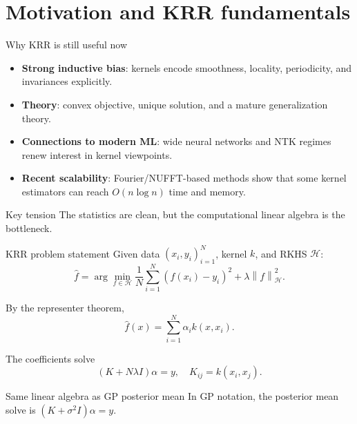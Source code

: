 \documentclass[aspectratio=169,10pt]{beamer}
\newcommand{\norm}[1]{\left\lVert #1 \right\rVert}
\begin{document}
\section{Motivation and KRR fundamentals}

\begin{frame}{Why KRR is still useful now}
\begin{itemize}
  \item \textbf{Strong inductive bias}: kernels encode smoothness, locality, periodicity, and invariances explicitly.
  \item \textbf{Theory}: convex objective, unique solution, and a mature generalization theory.
  \item \textbf{Connections to modern ML}: wide neural networks and NTK regimes renew interest in kernel viewpoints.
  \item \textbf{Recent scalability}: Fourier/NUFFT-based methods show that some kernel estimators can reach $O(n\log n)$ time and memory.
\end{itemize}

\vspace{0.5em}
\begin{block}{Key tension}
The statistics are clean, but the computational linear algebra is the bottleneck.
\end{block}
\end{frame}

\begin{frame}{KRR problem statement}
Given data $(x_i,y_i)_{i=1}^N$, kernel $k$, and RKHS $\mathcal{H}$:
\[
\hat f = \arg\min_{f\in\mathcal{H}}
\frac{1}{N}\sum_{i=1}^{N}(f(x_i)-y_i)^2 + \lambda\norm{f}_{\mathcal{H}}^2.
\]

By the representer theorem,
\[
\hat f(x)=\sum_{i=1}^N \alpha_i k(x,x_i).
\]

The coefficients solve
\[
(K+N\lambda I)\alpha = y,
\quad K_{ij}=k(x_i,x_j).
\]

\begin{block}{Same linear algebra as GP posterior mean}
In GP notation, the posterior mean solve is $(K+\sigma^2 I)\alpha=y$.
\end{block}
\end{frame}
\end{document}
